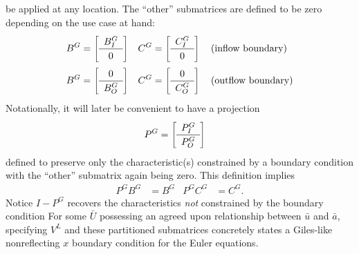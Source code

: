 be applied at any location.  The ``other'' submatrices are defined to be zero
depending on the use case at hand:
\begin{align}
  B^G &=
\renewcommand*{\arraystretch}{1.2}
  \left[\begin{array}{c} B^G_{I} \\ \hline 0       \end{array}\right]
  &
  C^G &=
\renewcommand*{\arraystretch}{1.2}
  \left[\begin{array}{c} C^G_{I} \\ \hline 0       \end{array}\right]
  &
  &\left(\text{inflow boundary}\right)
\\
  B^G &=
\renewcommand*{\arraystretch}{1.2}
  \left[\begin{array}{c} 0       \\ \hline B^G_{O} \end{array}\right]
  &
  C^G &=
\renewcommand*{\arraystretch}{1.2}
  \left[\begin{array}{c} 0       \\ \hline C^G_{O} \end{array}\right]
  &
  &\left(\text{outflow boundary}\right)
\end{align}
Notationally, it will later be convenient to have a projection
\begin{align}
\label{eq:PG}
\renewcommand*{\arraystretch}{1.2}
  P^G
  &=
  \left[\begin{array}{c} P^G_{I} \\ \hline P^G_{O} \end{array}\right]
\end{align}
defined to preserve only the characteristic(s) constrained by a boundary
condition with the ``other'' submatrix again being zero.  This definition
implies
\begin{align}
\label{eq:PGidempotence}
  P^G B^G &= B^G
  &
  P^G C^G &= C^G
.
\end{align}
Notice $I - P^G$ recovers the characteristics \emph{not} constrained by the
boundary condition For some $\bar{U}$ possessing an agreed upon relationship
between $\bar{u}$ and $\bar{a}$, specifying $V^L$ and these partitioned
submatrices concretely states a Giles-like nonreflecting $x$ boundary condition
for the Euler equations.

